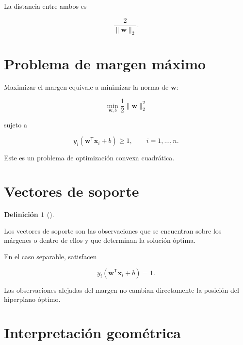 \documentclass[
  spanish,
  10.5pt,
  letterpaper,
  DIV=11,
  numbers=noendperiod,
  oneside,
  open=any]{scrreprt}
\theoremstyle{definition}
\newtheorem{definition}{Definición}[chapter]
\theoremstyle{definition}
\theoremstyle{plain}
\theoremstyle{remark}
\begin{document}
La distancia entre ambos es

\[
\frac{2}{\|\mathbf{w}\|_2}.
\]

\section*{Problema de margen máximo}\label{problema-de-margen-muxe1ximo}


Maximizar el margen equivale a minimizar la norma de \(\mathbf{w}\):

\[
\min_{\mathbf{w},b}
\frac{1}{2}
\|\mathbf{w}\|_2^2
\]

sujeto a

\[
y_i
\left(
\mathbf{w}^{\mathsf T}\mathbf{x}_i+b
\right)
\geq 1,
\qquad
i=1,\ldots,n.
\]

Este es un problema de optimización convexa cuadrática.

\section*{Vectores de soporte}\label{vectores-de-soporte}


\begin{definition}[]\protect\hypertarget{def-vectores-soporte}{}\label{def-vectores-soporte}

Los vectores de soporte son las observaciones que se encuentran sobre
los márgenes o dentro de ellos y que determinan la solución óptima.

\end{definition}

En el caso separable, satisfacen

\[
y_i
\left(
\mathbf{w}^{\mathsf T}\mathbf{x}_i+b
\right)
=
1.
\]

Las observaciones alejadas del margen no cambian directamente la
posición del hiperplano óptimo.

\section*{Interpretación
geométrica}\label{interpretaciuxf3n-geomuxe9trica-2}

\end{document}
